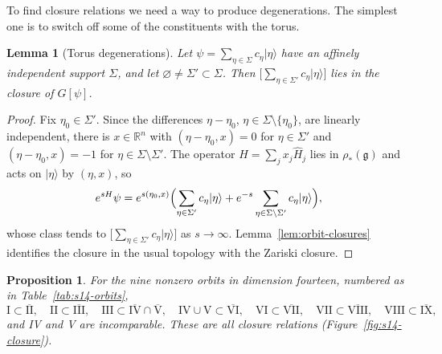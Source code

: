 \documentclass{article}
\newtheorem{proposition}[theorem]{Proposition}
\newtheorem{lemma}[theorem]{Lemma}
\theoremstyle{definition}
\theoremstyle{remark}
\newcommand{\R}{\mathbb R}
\newcommand{\ket}[1]{\lvert #1\rangle}
\begin{document}
To find closure relations we need a way to produce degenerations. The
simplest one is to switch off some of the constituents with the torus.

\begin{lemma}[Torus degenerations]
\label{lem:torus-degeneration}
Let $\psi=\sum_{\eta\in\Sigma}c_\eta\ket\eta$ have an affinely independent
support $\Sigma$, and let $\varnothing\ne\Sigma'\subset\Sigma$. Then
$\bigl[\sum_{\eta\in\Sigma'}c_\eta\ket\eta\bigr]$ lies in the closure of
$G[\psi]$.
\end{lemma}

\begin{proof}
Fix $\eta_0\in\Sigma'$. Since the differences $\eta-\eta_0$,
$\eta\in\Sigma\setminus\{\eta_0\}$, are linearly independent, there is
$x\in\R^n$ with $(\eta-\eta_0,x)=0$ for $\eta\in\Sigma'$ and $(\eta-\eta_0,x)=-1$
for $\eta\in\Sigma\setminus\Sigma'$. The operator
$H=\sum_jx_j\widehat H_j$ lies in $\rho_*(\mathfrak g)$ and acts on
$\ket\eta$ by $(\eta,x)$, so
\[
 e^{sH}\psi=e^{s(\eta_0,x)}\Bigl(\sum_{\eta\in\Sigma'}c_\eta\ket\eta
 +e^{-s}\sum_{\eta\in\Sigma\setminus\Sigma'}c_\eta\ket\eta\Bigr),
\]
whose class tends to $\bigl[\sum_{\eta\in\Sigma'}c_\eta\ket\eta\bigr]$ as
$s\to\infty$. Lemma~\ref{lem:orbit-closures} identifies the closure in the
usual topology with the Zariski closure.
\end{proof}

\begin{proposition}
\label{prop:s14-closure}
For the nine nonzero orbits in dimension fourteen, numbered as in
Table~\ref{tab:s14-orbits},
\[
 \mathrm I\subset\overline{\mathrm{II}},\quad
 \mathrm{II}\subset\overline{\mathrm{III}},\quad
 \mathrm{III}\subset\overline{\mathrm{IV}}\cap\overline{\mathrm V},\quad
 \mathrm{IV}\cup\mathrm V\subset\overline{\mathrm{VI}},\quad
 \mathrm{VI}\subset\overline{\mathrm{VII}},\quad
 \mathrm{VII}\subset\overline{\mathrm{VIII}},\quad
 \mathrm{VIII}\subset\overline{\mathrm{IX}},
\]
and IV and V are incomparable. These are all closure relations
(Figure~\ref{fig:s14-closure}).
\end{proposition}
\end{document}
